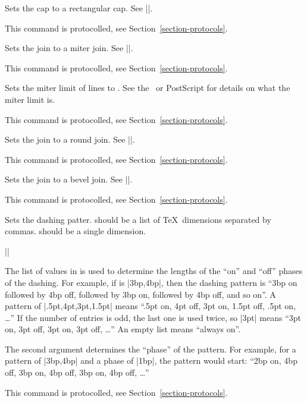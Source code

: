 \begin{command}{\pgfsys@rectcap}
    Sets the cap to a rectangular cap. See |\pgfsys@stroke|.

    This command is protocolled, see Section~\ref{section-protocols}.
\end{command}

\begin{command}{\pgfsys@miterjoin}
    Sets the join to a miter join. See |\pgfsys@stroke|.

    This command is protocolled, see Section~\ref{section-protocols}.
\end{command}

\begin{command}{\pgfsys@setmiterlimit{}}
    Sets the miter limit of lines to . See the \pdf\ or PostScript
    for details on what the miter limit is.

    This command is protocolled, see Section~\ref{section-protocols}.
\end{command}

\begin{command}{\pgfsys@roundjoin}
    Sets the join to a round join. See |\pgfsys@stroke|.

    This command is protocolled, see Section~\ref{section-protocols}.
\end{command}

\begin{command}{\pgfsys@beveljoin}
    Sets the join to a bevel join. See |\pgfsys@stroke|.

    This command is protocolled, see Section~\ref{section-protocols}.
\end{command}

\begin{command}{\pgfsys@setdash{}}
    Sets the dashing patter.  should be a list of \TeX\
    dimensions separated by commas.  should be a single dimension.

    \example |\pgfsys@setdash{3pt,3pt}{0pt}|

    The list of values in  is used to determine the lengths of
    the ``on'' and ``off'' phases of the dashing. For example, if
    \meta{pattern} is |3bp,4bp|, then the dashing pattern is ``3bp on followed
    by 4bp off, followed by 3bp on, followed by 4bp off, and so on''. A pattern
    of |.5pt,4pt,3pt,1.5pt| means ``.5pt on, 4pt off, 3pt on, 1.5pt off, .5pt
    on, \dots'' If the number of entries is odd, the last one is used twice, so
    |3pt| means ``3pt on, 3pt off, 3pt on, 3pt off, \dots'' An empty list means
    ``always on''.

    The second argument determines the ``phase'' of the pattern. For example,
    for a pattern of |3bp,4bp| and a phase of |1bp|, the pattern would start:
    ``2bp on, 4bp off, 3bp on, 4bp off, 3bp on, 4bp off, \dots''

    This command is protocolled, see Section~\ref{section-protocols}.
\end{command}

